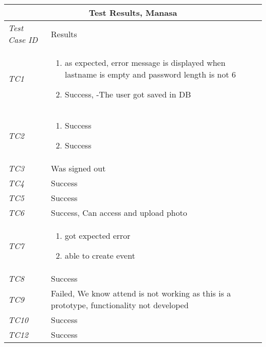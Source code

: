 %
\begin{minipage}{\linewidth}
\setlength{\tabcolsep}{15pt}
\centering
{}
\begin{tabular}{ |l|p{70mm}| }
	\hline
	\multicolumn{2}{|c|}{\cellcolor{gray!25} \textbf{Test Results, Manasa}} \\
	\hline
	\it{\cellcolor{gray!25}Test Case ID} & {\cellcolor{gray!25} Results } \\
	\hline
	\it{\cellcolor{gray!25}TC1} & \begin{enumerate}[label=\alph*)]
	                                \item as expected, error message is displayed when lastname is empty and password length is not 6
	                                \item Success, -The user got saved in DB
	                              \end{enumerate}\\ \hline
	\it{\cellcolor{gray!25}TC2} & \begin{enumerate}
	                                \item Success
	                                \item Success
	                              \end{enumerate}\\ \hline
	\it{\cellcolor{gray!25}TC3} & Was signed out \\ \hline
	\it{\cellcolor{gray!25}TC4} & Success \\ \hline
	\it{\cellcolor{gray!25}TC5} & Success \\ \hline
	\it{\cellcolor{gray!25}TC6} & Success, Can access and upload photo  \\ \hline
	\it{\cellcolor{gray!25}TC7} & \begin{enumerate}[label=\alph*)]
	                                \item got expected error
	                                \item able to  create event
	                              \end{enumerate}\\ \hline
	\it{\cellcolor{gray!25}TC8} & Success \\ \hline
	\it{\cellcolor{gray!25}TC9} & Failed, We know attend is not working as this is a prototype, functionality not developed \\ \hline
	\it{\cellcolor{gray!25}TC10} & Success \\ \hline
	\it{\cellcolor{gray!25}TC12} & Success \\ \hline

\end{tabular}
\end{minipage}
